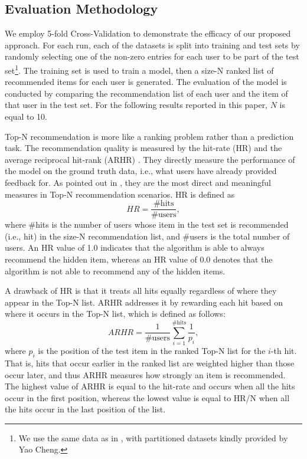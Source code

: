 \documentclass[letterpaper]{article}
\begin{document}
\subsection{Evaluation Methodology}
We employ 5-fold Cross-Validation to demonstrate the efficacy of our proposed approach. For each run, each of the datasets is split into training and test sets by randomly selecting one of the non-zero entries for each user to be part of the test set\footnote{We use the same data as in \cite{cheng2014lorslim}, with partitioned datasets kindly provided by Yao Cheng.}. The training set is used to train a model, then a size-N ranked list of recommended items for each user is generated. The evaluation of the model is conducted by comparing the recommendation list of each user and the item of that user in the test set. For the following results reported in this paper, $N$ is equal to 10.

Top-N recommendation is more like a ranking problem rather than a prediction task. The recommendation quality is measured by the hit-rate (HR) and the average reciprocal hit-rank (ARHR) \cite{deshpande2004item}. They directly measure the performance of the model on the ground truth data, i.e., what users have already provided feedback for. As pointed out in \cite{ning2011slim}, they are the most direct and meaningful measures in Top-N recommendation scenarios. HR is defined as
\begin{equation}
HR=\frac{\#\textrm{hits}}{\#\textrm{users}},
\end{equation}
where \#hits is the number of users whose item in the test set is recommended (i.e., hit) in the size-N recommendation list, and \#users is the total number of users. An HR value of 1.0 indicates that the algorithm is able to always recommend the hidden item, whereas an HR value of 0.0 denotes that the algorithm is not able to recommend any of the hidden items.

A drawback of HR is that it treats all hits equally regardless of where they appear in the Top-N list. ARHR addresses it by rewarding each hit based on where it occurs in the Top-N list, which is defined as follows:
\begin{equation}
ARHR=\frac{1}{\#\textrm{users}}\sum_{i=1}^{\#\textrm{hits}}\frac{1}{p_i},
\end{equation}
where $p_i$ is the position of the test item in the ranked Top-N list for the $i$-th hit. That is, hits that occur earlier in the ranked list are weighted higher than those occur later, and thus ARHR measures how strongly an item is recommended. The highest value of ARHR is equal to the hit-rate and occurs when all the hits occur in the first position, whereas the lowest value is equal to HR/N when all the hits occur in the last position of the list.
\end{document}
